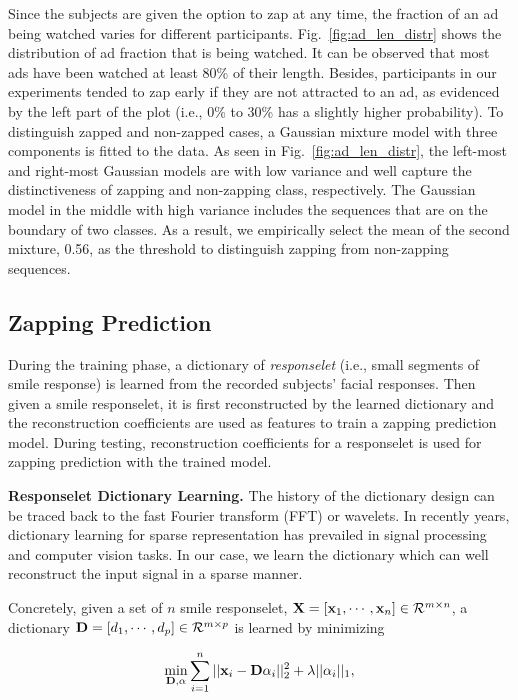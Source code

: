 \documentclass[twoside,leqno,twocolumn]{article}
\begin{document}
Since the subjects are given the option to zap at any time, the fraction of an ad being watched varies for different participants. Fig.~\ref{fig:ad_len_distr} shows the distribution of ad fraction that is being watched. It can be observed that most ads have been watched at least 80\% of their length. Besides, participants in our experiments tended to zap early if they are not attracted to an ad, as evidenced by the left part of the plot (i.e., 0\% to 30\% has a slightly higher probability). To distinguish zapped and non-zapped cases, a Gaussian mixture model with three components is fitted to the data. As seen in Fig.~\ref{fig:ad_len_distr}, the left-most and right-most Gaussian models are with low variance and well capture the distinctiveness of zapping and non-zapping class, respectively. The Gaussian model in the middle with high variance includes the sequences that are on the boundary of two classes. As a result, we empirically select the mean of the second mixture, 0.56, as the threshold to distinguish zapping from non-zapping sequences.



\subsection{Zapping Prediction}

During the training phase, a dictionary of \textit{responselet} (i.e., small segments of smile response) is learned from the recorded subjects' facial responses. Then given a smile responselet, it is first reconstructed by the learned dictionary and the reconstruction coefficients are used as features to train a zapping prediction model. During testing, reconstruction coefficients for a responselet is used for zapping prediction with the trained model. 

\noindent \textbf{Responselet Dictionary Learning.} The history of the dictionary design can be traced back to the fast Fourier transform (FFT) or wavelets. In recently years, dictionary learning for sparse representation has prevailed in signal processing and computer vision tasks. In our case, we learn the dictionary which can well reconstruct the input signal in a sparse manner. 

Concretely, given a set of $n$ smile responselet, ${\bf X}=[{\bf x}_1, \cdots, {\bf x}_n]\in \mathcal{R}^{m\times n}$, a dictionary ${\bf D}=[d_1,\cdots,d_p] \in \mathcal{R}^{m\times p}$ is learned by minimizing

\begin{align}
\label{eq:learn_dict}
\min_{{\bf D} , \alpha} \sum_{i=1}^n ||{\bf x}_i-{\bf D}\alpha_i||^2_2 +\lambda ||\alpha_i||_1,
\end{align}
\end{document}
